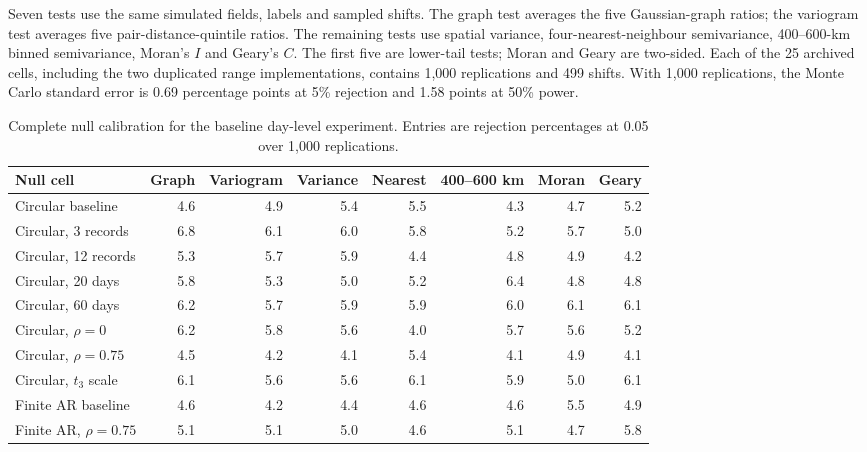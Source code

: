 \documentclass[namedate,webpdf,modern,mediumone]{oup-authoring-template}
\theoremstyle{thmstyleone}
\begin{document}
Seven tests use the same simulated fields, labels and sampled shifts. The graph
test averages the five Gaussian-graph ratios; the variogram test averages five
pair-distance-quintile ratios. The remaining tests use spatial variance,
four-nearest-neighbour semivariance, 400--600-km binned semivariance, Moran's
$I$ and Geary's $C$. The first five are lower-tail tests; Moran and Geary are
two-sided. Each of the 25 archived cells, including the two duplicated range
implementations, contains 1,000 replications and 499 shifts.
With 1,000 replications, the Monte Carlo standard error is 0.69 percentage
points at 5\% rejection and 1.58 points at 50\% power.

\begin{table}[htbp]
\centering
\caption{Complete null calibration for the baseline day-level experiment.
Entries are rejection percentages at 0.05 over 1,000 replications.}
\label{tab:baseline-null-complete}
\scriptsize
\setlength{\tabcolsep}{3.5pt}
\begin{tabular}{lrrrrrrr}
\toprule
Null cell & Graph & Variogram & Variance & Nearest & 400--600 km & Moran & Geary \\
\midrule
Circular baseline       & 4.6 & 4.9 & 5.4 & 5.5 & 4.3 & 4.7 & 5.2 \\
Circular, 3 records     & 6.8 & 6.1 & 6.0 & 5.8 & 5.2 & 5.7 & 5.0 \\
Circular, 12 records    & 5.3 & 5.7 & 5.9 & 4.4 & 4.8 & 4.9 & 4.2 \\
Circular, 20 days       & 5.8 & 5.3 & 5.0 & 5.2 & 6.4 & 4.8 & 4.8 \\
Circular, 60 days       & 6.2 & 5.7 & 5.9 & 5.9 & 6.0 & 6.1 & 6.1 \\
Circular, $\rho=0$      & 6.2 & 5.8 & 5.6 & 4.0 & 5.7 & 5.6 & 5.2 \\
Circular, $\rho=0.75$   & 4.5 & 4.2 & 4.1 & 5.4 & 4.1 & 4.9 & 4.1 \\
Circular, $t_3$ scale   & 6.1 & 5.6 & 5.6 & 6.1 & 5.9 & 5.0 & 6.1 \\
Finite AR baseline      & 4.6 & 4.2 & 4.4 & 4.6 & 4.6 & 5.5 & 4.9 \\
Finite AR, $\rho=0.75$  & 5.1 & 5.1 & 5.0 & 4.6 & 5.1 & 4.7 & 5.8 \\
\bottomrule
\end{tabular}
\end{table}
\end{document}
